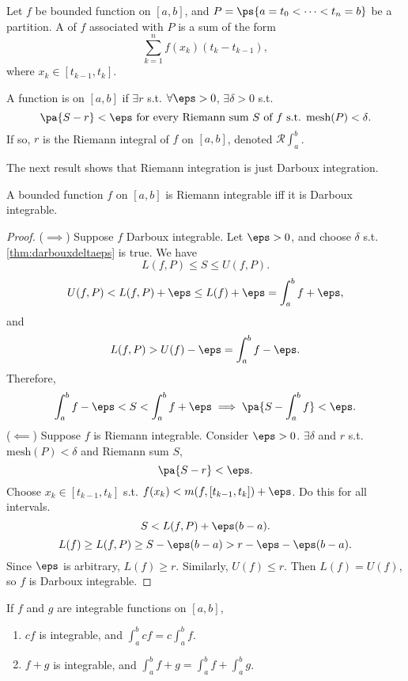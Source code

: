 \documentclass[11pt]{scrartcl}
\numberwithin{equation}{section}
\begin{document}
\begin{definition}
    Let $f$ be bounded function on $[a,b]$, and $P=\ps{a=t_0<\cdots<t_n=b}$
    be a partition. A  of $f$ associated with $P$
    is a sum of the form 
    \[
        \sum_{k=1}^{n}f(x_k)(t_k-t_{k-1}),
    \]
    where $x_k\in[t_{k-1},t_k]$.

    A function is  on $[a,b]$ if $\exists r$
    s.t. $\forall \eps>0$, $\exists \delta>0$ s.t.
    \[
        \pa{S-r}<\eps \text{ for every Riemann sum $S$ of $f$ s.t. $\mathrm{mesh}(P)<\delta$}.
    \]
    If so, $r$ is the Riemann integral of $f$ on $[a,b]$, denoted 
    $\mathscr{R}\int_a^b$.
\end{definition}
The next result shows that Riemann integration is just 
Darboux integration.

\begin{theorem}
    A bounded function $f$ on $[a,b]$ is Riemann integrable iff it is Darboux integrable.
\end{theorem}

\begin{proof}
    ($\implies$) 
    Suppose $f$ Darboux integrable. Let $\eps>0$, and choose $\delta$ s.t.
    \cref{thm:darbouxdeltaeps} is true.
    We have 
    \[
        L(f,P) \leq S \leq U(f,P).
    \]
    \[
        U(f,P) < L(f,P)+\eps \leq L(f)+\eps = \int_a^b f + \eps,
    \]
    and 
    \[
        L(f,P) > U(f)-\eps = \int_a^b f - \eps.
    \]
    Therefore, 
    \[
        \int_a^b f -\eps < S < \int_a^b f+ \eps \implies \pa{S - \int_a^bf}< \eps.
    \]
    ($\impliedby$) Suppose $f$ is Riemann integrable. Consider $\eps>0$. $\exists \delta$ and $r$ s.t. $\mathrm{mesh}(P)<\delta$
    and Riemann sum $S$, 
    \[
        \pa{S-r}<\eps.
    \]
    Choose $x_k \in [t_{k-1},t_k]$ s.t. $f(x_k) < m(f, [t_{k-1}, t_k]) + \eps$. Do this for all intervals.
    \[
        S < L(f,P) + \eps(b-a).
    \]
    \[
        L(f) \geq L(f,P) \geq S - \eps(b-a) > r-\eps-\eps(b-a).
    \]
    Since $\eps$ is arbitrary, $L(f)\geq r$. Similarly, $U(f)\leq r$.
    Then $L(f)=U(f)$, so $f$ is Darboux integrable.
\end{proof}

\begin{proposition}
    \label{prop:riemannintegrationprop}
    If $f$ and $g$ are integrable functions on $[a,b]$,
    \begin{enumerate}
        \item $cf$ is integrable, and $\int_a^b cf = c\int_a^b f$.
        \item $f+g$ is integrable, and $\int_a^b f+g = \int_a^b f+\int_a^b g$.
    \end{enumerate}
\end{proposition}
\end{document}
